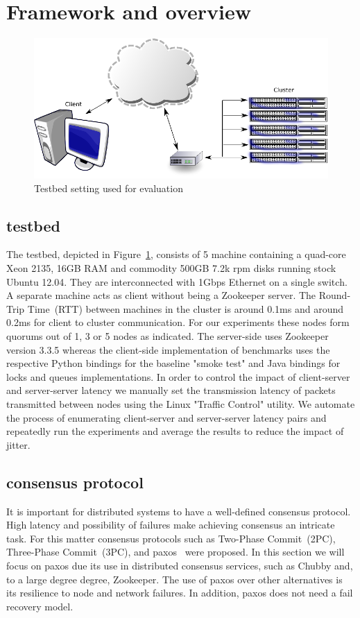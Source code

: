 \section{Framework and overview}\label{sec:framework}

\begin{figure}[ht]
\centering
\includegraphics[scale=0.85]{img/framework.eps}
\caption{Testbed setting used for evaluation}
\label{fig:framework}
\end{figure}

\subsection{testbed}
The testbed, depicted in Figure~\ref{fig:framework}, consists of 5 machine containing a quad-core Xeon 2135, 16GB RAM and commodity 500GB 7.2k rpm disks running stock Ubuntu 12.04. They are interconnected with 1Gbps Ethernet on a single switch. A separate machine acts as client without being a Zookeeper server. The Round-Trip Time~(RTT) between machines in the cluster is around 0.1ms and around 0.2ms for client to cluster communication. For our experiments these nodes form quorums out of 1, 3 or 5 nodes as indicated. The server-side uses Zookeeper version 3.3.5 whereas the client-side implementation of benchmarks uses the respective Python bindings for the baseline "smoke test" and Java bindings for locks and queues implementations.
In order to control the impact of client-server and server-server latency we manually set the transmission latency of packets transmitted between nodes using the Linux "Traffic Control" utility. We automate the process of enumerating client-server and server-server latency pairs and repeatedly run the experiments and average the results to reduce the impact of jitter.

\subsection{consensus protocol}
It is important for distributed systems to have a well-defined consensus protocol. High latency and possibility of failures make achieving consensus an intricate task. For this matter consensus protocols such as Two-Phase Commit~(2PC), Three-Phase Commit~(3PC), and paxos~\cite{paxos} were proposed. In this section we will focus on paxos due its use in distributed consensus services, such as Chubby and, to a large degree degree, Zookeeper. The use of paxos over other alternatives is its resilience to node and network failures. In addition, paxos does not need a fail recovery model.

